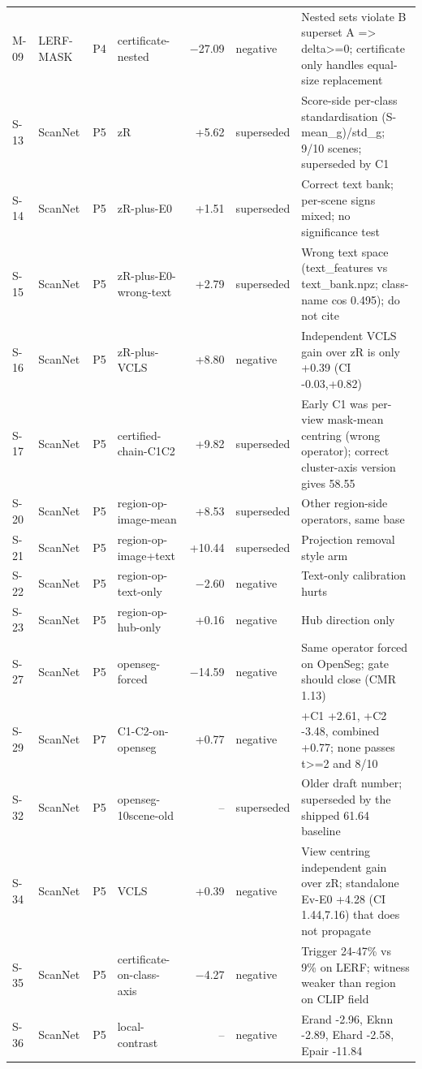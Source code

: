 \begin{table}[t]
\begin{tabular}{llllrlp{6.0cm}}
M-09 & LERF-MASK & P4 & certificate-nested & $-$27.09 & negative & Nested sets violate B superset A => delta>=0; certificate only handles equal-size replacement \\
S-13 & ScanNet & P5 & zR & +5.62 & superseded & Score-side per-class standardisation (S-mean\_g)/std\_g; 9/10 scenes; superseded by C1 \\
S-14 & ScanNet & P5 & zR-plus-E0 & +1.51 & superseded & Correct text bank; per-scene signs mixed; no significance test \\
S-15 & ScanNet & P5 & zR-plus-E0-wrong-text & +2.79 & superseded & Wrong text space (text\_features vs text\_bank.npz; class-name cos 0.495); do not cite \\
S-16 & ScanNet & P5 & zR-plus-VCLS & +8.80 & negative & Independent VCLS gain over zR is only +0.39 (CI -0.03,+0.82) \\
S-17 & ScanNet & P5 & certified-chain-C1C2 & +9.82 & superseded & Early C1 was per-view mask-mean centring (wrong operator); correct cluster-axis version gives 58.55 \\
S-20 & ScanNet & P5 & region-op-image-mean & +8.53 & superseded & Other region-side operators, same base \\
S-21 & ScanNet & P5 & region-op-image+text & +10.44 & superseded & Projection removal style arm \\
S-22 & ScanNet & P5 & region-op-text-only & $-$2.60 & negative & Text-only calibration hurts \\
S-23 & ScanNet & P5 & region-op-hub-only & +0.16 & negative & Hub direction only \\
S-27 & ScanNet & P5 & openseg-forced & $-$14.59 & negative & Same operator forced on OpenSeg; gate should close (CMR 1.13) \\
S-29 & ScanNet & P7 & C1-C2-on-openseg & +0.77 & negative & +C1 +2.61, +C2 -3.48, combined +0.77; none passes t>=2 and 8/10 \\
S-32 & ScanNet & P5 & openseg-10scene-old & -- & superseded & Older draft number; superseded by the shipped 61.64 baseline \\
S-34 & ScanNet & P5 & VCLS & +0.39 & negative & View centring independent gain over zR; standalone Ev-E0 +4.28 (CI 1.44,7.16) that does not propagate \\
S-35 & ScanNet & P5 & certificate-on-class-axis & $-$4.27 & negative & Trigger 24-47\% vs 9\% on LERF; witness weaker than region on CLIP field \\
S-36 & ScanNet & P5 & local-contrast & -- & negative & Erand -2.96, Eknn -2.89, Ehard -2.58, Epair -11.84 \\

\end{tabular}
\end{table}

